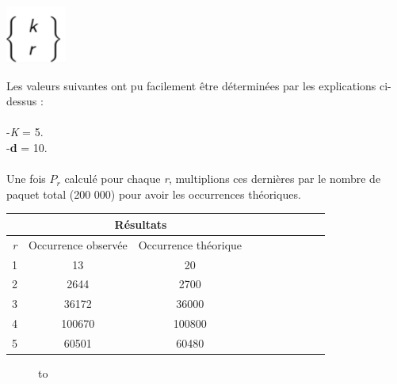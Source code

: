 \documentclass[french]{article}
\begin{document}
	\begin{center}
		\includegraphics[scale=0.40]{Archives/Images/stirling}
	\end{center}

Les valeurs suivantes ont pu facilement être déterminées par les explications ci-dessus :
\\
\\
	-\textit{K} = 5.
	\\
	-\textbf{d} = 10.
\\
\\
Une fois $P_{r}$ calculé pour chaque \textit{r}, multiplions ces dernières par le nombre de paquet total (200 000) pour avoir les occurrences théoriques.

\begin{longtable}{|c|c|c|c|c|c|c|c|c|c|}
	\hline
	& \multicolumn{3}{c|}{\textbf{Résultats}} \\ 
	\hline 
	\textit{r}  & Occurrence observée & Occurrence théorique \\
	\hline 
	1 & 13  & 20\\
	2 & 2644 & 2700 \\
	3 & 36172 & 36000\\
	4 & 100670 & 100800\\
	5 & 60501  & 60480\\ 
	\hline 
\end{longtable}

\newpage
	\begin{figure}[h!]
		\hbox to
		\caption{\label{toucan}}
	\end{figure}
\end{document}
